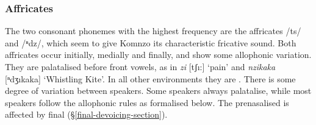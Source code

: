 \subsubsection{Affricates} \label{affricates}

The two consonant phonemes with the highest frequency are the affricates  /ts/ and /{ⁿ}dz/, which seem to give Komnzo its characteristic fricative sound. Both affricates occur initially, medially and finally, and show some allophonic variation. They are palatalised before front vowels, as in \emph{zi} [tʃı:] `pain' and \emph{nzikaka} [ⁿdʒıkaka] `Whistling Kite'. In all other environments they are . There is some degree of variation between speakers. Some speakers always palatalise, while most speakers follow the allophonic rules as formalised below. The prenasalised  is affected by final  ({\S}\ref{final-devoicing-section}).

